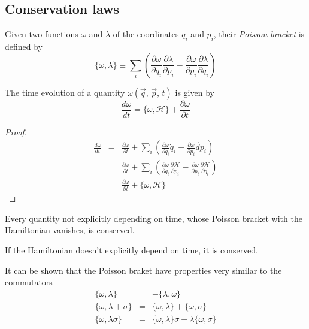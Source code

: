 \documentclass[11pt,fleqn]{book} %
\begin{document}
\subsection{Conservation laws}
\begin{definition}
    Given two functions $\omega$ and $\lambda$ of the coordinates $q_i$ and $p_i$, their \textit{Poisson bracket} is defined by
    \begin{equation*}
        \{\omega,\lambda\} \equiv
            \sum_i\left(\frac{\partial\omega}{\partial q_i}\frac{\partial\lambda}{\partial p_i} - \frac{\partial\omega}{\partial p_i}\frac{\partial\lambda}{\partial q_i} \right)
    \end{equation*}
\end{definition}
\begin{theorem}
    \label{theorem_poisson_bracket}
    The time evolution of a quantity $\omega(\vec q,\,\vec p,\,t)$ is given by 
    \begin{equation*}
        \frac{d\omega}{dt} = \{\omega,\mathcal{H}\}+\frac{\partial\omega}{\partial t}
    \end{equation*}
\end{theorem}
\begin{proof}
    \begin{eqnarray*}
        \frac{d\omega}{dt} &=& \frac{\partial\omega}{\partial t}
        + \sum_i\left(\frac{\partial\omega}{\partial q_i}\dot{q}_i + \frac{\partial\omega}{\partial p_i}\dot{dp}_i\right) \\
        &=& \frac{\partial\omega}{\partial t} 
        + \sum_i\left(\frac{\partial\omega}{\partial q_i}\frac{\partial\mathcal{H}}{\partial p_i}
        - \frac{\partial\omega}{\partial p_i}\frac{\partial\mathcal{H}}{\partial q_i} \right) \\
        &=&\frac{\partial\omega}{\partial t} + \{\omega,\mathcal{H}\}
    \end{eqnarray*}
\end{proof}

\begin{corollary}
    Every quantity not explicitly depending on time, whose Poisson bracket with the Hamiltonian vanishes, is conserved.
\end{corollary}
\begin{corollary}
    If the Hamiltonian doesn't explicitly depend on time, it is conserved.
\end{corollary}

It can be shown that the Poisson braket have properties very similar to the commutators
\begin{eqnarray*}
    \{\omega,\lambda\} &=& -\{\lambda,\omega\} \\
    \{\omega,\lambda + \sigma\} &=& \{\omega,\lambda\} + \{\omega,\sigma\} \\
    \{\omega,\lambda\sigma\} &=& \{\omega,\lambda\}\sigma + \lambda\{\omega,\sigma\}
\end{eqnarray*}
\end{document}
